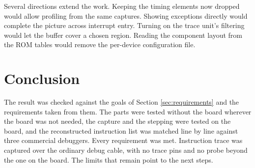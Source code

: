 Several directions extend the work. Keeping the timing elements now dropped would allow profiling from the same captures. Showing exceptions directly would complete the picture across interrupt entry. Turning on the trace unit's filtering would let the buffer cover a chosen region. Reading the component layout from the ROM tables would remove the per-device configuration file.


\section{Conclusion}
The result was checked against the goals of Section \ref{sec:requirements} and the requirements taken from them. The parts were tested without the board wherever the board was not needed, the capture and the stepping were tested on the board, and the reconstructed instruction list was matched line by line against three commercial debuggers. Every requirement was met. Instruction trace was captured over the ordinary debug cable, with no trace pins and no probe beyond the one on the board. The limits that remain point to the next steps.
